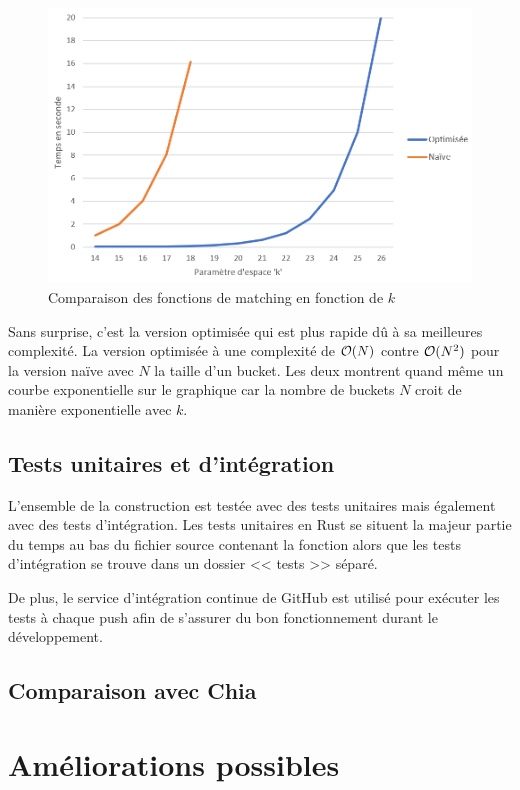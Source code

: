 \begin{figure}[H]
  \centering
  \includegraphics[width=14cm]{images/bench_matching.png}
  \caption{Comparaison des fonctions de matching en fonction de $k$}
\end{figure}

Sans surprise, c'est la version optimisée qui est plus rapide dû à sa meilleures complexité. La version optimisée à une complexité de $\mathcal{O}(N)$ contre $\mathcal{O}(N^2)$ pour la version naïve avec $N$ la taille d'un bucket. Les deux montrent quand même un courbe exponentielle sur le graphique car la nombre de buckets $N$ croit de manière exponentielle avec $k$.

\subsection{Tests unitaires et d'intégration}

L'ensemble de la construction est testée avec des tests unitaires mais également avec des tests d'intégration. Les tests unitaires en Rust se situent la majeur partie du temps au bas du fichier source contenant la fonction alors que les tests d'intégration se trouve dans un dossier << tests >> séparé. 

De plus, le service d'intégration continue de GitHub est utilisé pour exécuter les tests à chaque push afin de s'assurer du bon fonctionnement durant le développement. 

\subsection{Comparaison avec Chia}

\section{Améliorations possibles}


